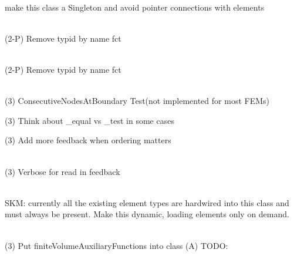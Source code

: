 \begin{DoxyRefList}
\item[Class \doxylink{classcsmp_1_1_finite_element}{csmp\+::Finite\+Element} ]\hfill \\
\label{todo__todo000026}%
%
make this class a Singleton and avoid pointer connections with elements 
\item[Member \doxylink{classcsmp_1_1_finite_element_a066cbd92cd983a3c2e73859286280587}{csmp\+::Finite\+Element\+::Element\+Type\+Of\+Face} (uint32\+\_\+t face) const]\hfill \\
\label{todo__todo000069}%
%
(2-\/P) Remove typid by name fct  
\item[Member \doxylink{classcsmp_1_1_finite_element_a136f53aa9d4cd295a984ca46c0864ff7}{csmp\+::Finite\+Element\+::Element\+Type\+Of\+Segment} (uint32\+\_\+t segment) const]\hfill \\
\label{todo__todo000070}%
%
(2-\/P) Remove typid by name fct  
\item[Class \doxylink{classcsmp_1_1_finite_element___test}{csmp\+::Finite\+Element\+\_\+\+Test} ]\hfill \\
\label{todo__todo000249}%
%
(3) Consecutive\+Nodes\+At\+Boundary Test(not implemented for most FEMs) 



(3) Think about \+\_\+equal vs \+\_\+test in some cases 



(3) Add more feedback when ordering matters 
\item[Class \doxylink{classcsmp_1_1_finite_element___test_data}{csmp\+::Finite\+Element\+\_\+\+Test\+Data} ]\hfill \\
\label{todo__todo000259}%
%
(3) Verbose for read in feedback 
\item[Class \doxylink{classcsmp_1_1_finite_element_manager}{csmp\+::Finite\+Element\+Manager} ]\hfill \\
\label{todo__todo000012}%
%
SKM\+: currently all the existing element types are hardwired into this class and must always be present. Make this dynamic, loading elements only on demand. 
\item[Class \doxylink{classcsmp_1_1_finite_volume_policy_3_013_u_00_01_c_e_l_l_01_4}{csmp\+::Finite\+Volume\+Policy\texorpdfstring{$<$}{<} 3U, CELL \texorpdfstring{$>$}{>}} ]\hfill \\
\label{todo__todo000027}%
%
(3) Put finite\+Volume\+Auxiliary\+Functions into  class (A) TODO\+: 




\end{DoxyRefList}
